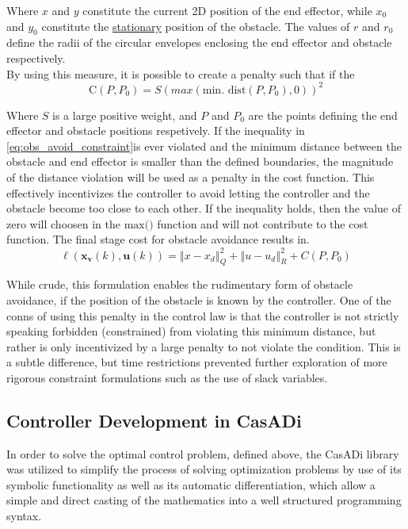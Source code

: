 \documentclass[journal]{IEEEtran}
\begin{document}
Where $x$ and $y$ constitute the current 2D position of the end effector, while $x_0$ and $y_0$ constitute the \underline{stationary} position of the obstacle. The values of $r$ and $r_0$ define the radii of the circular envelopes enclosing the end effector and obstacle respectively. \\

By using this measure, it is possible to create a penalty such that if the
\begin{equation}
\text{C}(P,P_0) = S(max(\text{min. dist}(P, P_0), 0))^2
\end{equation}

Where $S$ is a large positive weight, and $P$ and $P_0$ are the points defining the end effector and obstacle positions respetively. If the inequality in \ref{eq:obs_avoid_constraint}is ever violated and the minimum distance between the obstacle and end effector is smaller than the defined boundaries, the magnitude of the distance violation will be used as a penalty in the cost function. This effectively incentivizes the controller to avoid letting the controller and the obstacle become too close to each other. If the inequality holds, then the value of zero will choosen in the $\text{max()}$ function and will not contribute to the cost function. The final stage cost for obstacle avoidance results in. \\
\begin{equation}
  \ell\left(\mathbf{x}_{\mathbf{v}}(k), \mathbf{u}(k)\right) = \left\Vert x - x_d \right\Vert^{2}_{Q} + \left\Vert u -u_d \right\Vert^{2}_{R} + C(P,P_0)
\end{equation}

While crude, this formulation enables the rudimentary form of obstacle avoidance, if the position of the obstacle is known by the controller. One of the conns of using this penalty in the control law is that the controller is not strictly speaking forbidden (constrained) from violating this minimum distance, but rather is only incentivized by a large penalty to not violate the condition. This is a subtle difference, but time restrictions prevented further exploration of more rigorous constraint formulations such as the use of slack variables. \cite{soft_constraints}

\subsection{Controller Development in CasADi}
In order to solve the optimal control problem, defined above, the CasADi library was utilized to simplify the process of solving optimization problems by use of its symbolic functionality as well as its automatic differentiation, which allow a simple and direct casting of the mathematics into a well structured programming syntax. \\
\end{document}
